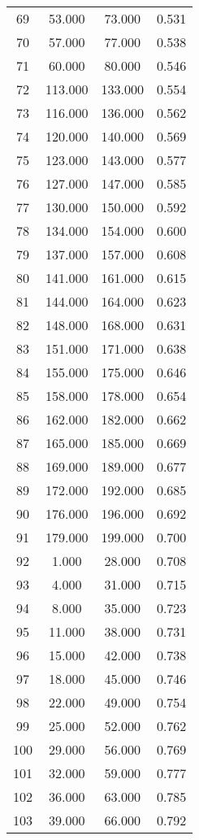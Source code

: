\begin{tabular}{cccc}
  69 & 53.000 & 73.000 & 0.531 \\ 
  70 & 57.000 & 77.000 & 0.538 \\ 
  71 & 60.000 & 80.000 & 0.546 \\ 
  72 & 113.000 & 133.000 & 0.554 \\ 
  73 & 116.000 & 136.000 & 0.562 \\ 
  74 & 120.000 & 140.000 & 0.569 \\ 
  75 & 123.000 & 143.000 & 0.577 \\ 
  76 & 127.000 & 147.000 & 0.585 \\ 
  77 & 130.000 & 150.000 & 0.592 \\ 
  78 & 134.000 & 154.000 & 0.600 \\ 
  79 & 137.000 & 157.000 & 0.608 \\ 
  80 & 141.000 & 161.000 & 0.615 \\ 
  81 & 144.000 & 164.000 & 0.623 \\ 
  82 & 148.000 & 168.000 & 0.631 \\ 
  83 & 151.000 & 171.000 & 0.638 \\ 
  84 & 155.000 & 175.000 & 0.646 \\ 
  85 & 158.000 & 178.000 & 0.654 \\ 
  86 & 162.000 & 182.000 & 0.662 \\ 
  87 & 165.000 & 185.000 & 0.669 \\ 
  88 & 169.000 & 189.000 & 0.677 \\ 
  89 & 172.000 & 192.000 & 0.685 \\ 
  90 & 176.000 & 196.000 & 0.692 \\ 
  91 & 179.000 & 199.000 & 0.700 \\ 
  92 & 1.000 & 28.000 & 0.708 \\ 
  93 & 4.000 & 31.000 & 0.715 \\ 
  94 & 8.000 & 35.000 & 0.723 \\ 
  95 & 11.000 & 38.000 & 0.731 \\ 
  96 & 15.000 & 42.000 & 0.738 \\ 
  97 & 18.000 & 45.000 & 0.746 \\ 
  98 & 22.000 & 49.000 & 0.754 \\ 
  99 & 25.000 & 52.000 & 0.762 \\ 
  100 & 29.000 & 56.000 & 0.769 \\ 
  101 & 32.000 & 59.000 & 0.777 \\ 
  102 & 36.000 & 63.000 & 0.785 \\ 
  103 & 39.000 & 66.000 & 0.792 \\ 

\end{tabular}
